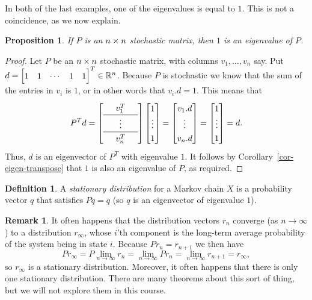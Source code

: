 \documentclass[reqno]{amsart}
\newtheorem{proposition}[theorem]{Proposition}
\theoremstyle{definition}
\newtheorem{remark}[theorem]{Remark}
\newtheorem{definition}[theorem]{Definition}
\newcommand{\dfn}[1]{\emph{{#1}}\index{#1}}
\begin{document}
In both of the last examples, one of the eigenvalues is equal to $1$.
This is not a coincidence, as we now explain.

\begin{proposition}\label{prop-stochastic-eigenvalue}
 If $P$ is an $n\times n$ stochastic matrix, then $1$ is an eigenvalue of
 $P$.
\end{proposition}
\begin{proof}
 Let $P$ be an $n\times n$ stochastic matrix, with columns
 $v_1,\dotsc,v_n$ say.  Put $d=\bbm 1&1&\cdots&1&1\ebm^T\in\R^n$.
 Because $P$ is stochastic we know that the sum of the entries in
 $v_i$ is $1$, or in other words that $v_i.d=1$.  This means that
 \[ \renewcommand{\arraystretch}{1.3}
  P^Td
  = \left[\begin{array}{ccc}
     & v_1^T  & \\ \hline
     & \vdots & \\ \hline
     & v_n^T  &
    \end{array}\right]
    \bbm 1 \\ \vdots \\ 1 \ebm
  = \bbm v_1.d \\ \vdots \\ v_n.d \ebm
  = \bbm 1 \\ \vdots \\ 1 \ebm
  = d.
 \]
 Thus, $d$ is an eigenvector of $P^T$ with eigenvalue $1$.  It follows
 by Corollary~\ref{cor-eigen-transpose} that $1$ is also an eigenvalue
 of $P$, as required.
\end{proof}

\begin{definition}\label{defn-stationary}
 A \dfn{stationary distribution} for a Markov chain $X$ is a
 probability vector $q$ that satisfies $Pq=q$ (so $q$ is an
 eigenvector of eigenvalue $1$).
\end{definition}

\begin{remark}\label{rem-stationary}
 It often happens that the distribution vectors $r_n$ converge (as
 $n\to\infty$) to a distribution $r_{\infty}$, whose $i$'th component
 is the long-term average probability of the system being in state
 $i$.  Because $Pr_n=r_{n+1}$ we then have
 \[ P r_\infty = P\lim_{n\to\infty} r_n =
     \lim_{n\to\infty} Pr_n = \lim_{n\to\infty} r_{n+1} = r_\infty,
 \]
 so $r_\infty$ is a stationary distribution.  Moreover, it often
 happens that there is only one stationary distribution.  There
 are many theorems about this sort of thing, but we will not explore
 them in this course.
\end{remark}
\end{document}
